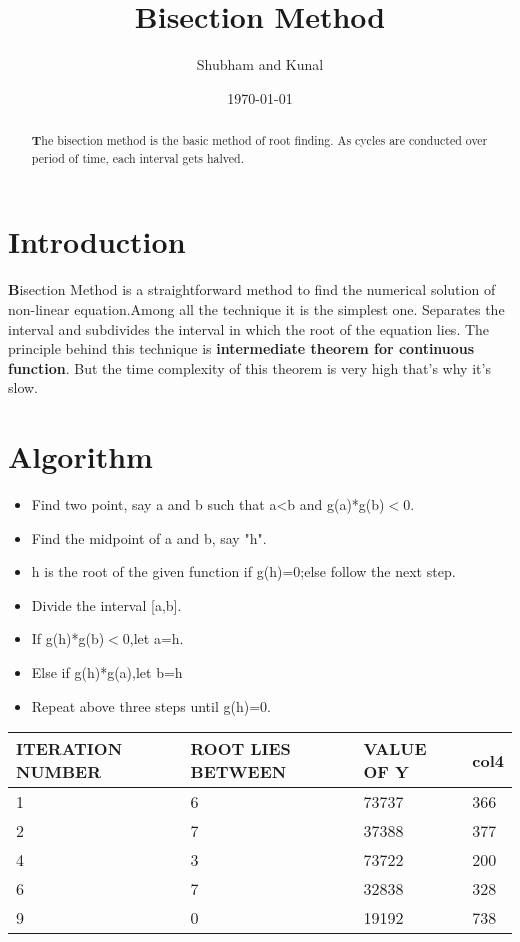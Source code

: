 \documentclass[10pt,a4 paper]{article}
\title{\Large\textbf{Bisection Method}}
\author{Shubham and Kunal}
\date{\today}
\begin{document}
\maketitle

\begin{abstract}
\textbf{T}he bisection method is the basic method of root finding. As cycles are conducted over period of time, each interval gets halved.
\end{abstract}

\section{Introduction}
\textbf{B}isection Method is a straightforward method to find the numerical solution of non-linear equation.Among all the technique it is the simplest one. Separates the interval and subdivides the interval in which the root of the equation lies.
The principle behind this technique is \textbf{intermediate theorem for continuous function}.
But the time complexity of this theorem is very high that's why it's slow.

\section{Algorithm}
\begin{itemize}[label={$\bullet$}]
\item Find two point, say a and b such that a<b and g(a)*g(b)$<$0.
\item Find the midpoint of a and b, say "h".
\item h is the root of the given function if g(h)=0;else follow the next step.
\item Divide the interval [a,b].
\item If g(h)*g(b)$<$0,let a=h.
\item Else if g(h)*g(a),let b=h
\item Repeat above three steps until g(h)=0.

\end{itemize}


\begin{center}
\begin{tabular}{ |m{5em}| m{1cm}| m{1cm}| m{1cm}|}
\hline
ITERATION NUMBER&ROOT LIES BETWEEN&VALUE OF Y&col4\\[0.5ex]
\hline\hline
1 & 6 & 73737 & 366 \\
\hline
2 & 7 & 37388 & 377\\
\hline
4 & 3 & 73722 & 200\\
\hline
6 & 7 & 32838 & 328\\
\hline
9 & 0 & 19192 & 738\\ [1ex]


\hline
\end{tabular}
\end{center}
\end{document}
